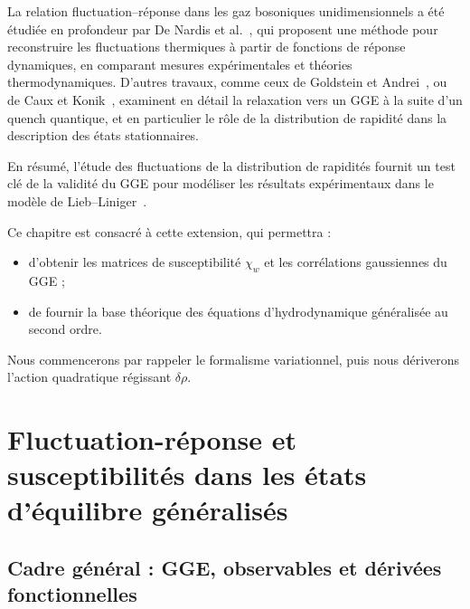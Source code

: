 {La relation fluctuation–réponse dans les gaz bosoniques unidimensionnels a été étudiée en profondeur par De Nardis et al.~\cite{DeNardis2017}, qui proposent une méthode pour reconstruire les fluctuations thermiques à partir de fonctions de réponse dynamiques, en comparant mesures expérimentales et théories thermodynamiques. D'autres travaux, comme ceux de Goldstein et Andrei~\cite{Goldstein2013}, ou de Caux et Konik~\cite{CauxKonik2012}, examinent en détail la relaxation vers un GGE à la suite d’un quench quantique, et en particulier le rôle de la distribution de rapidité dans la description des états stationnaires.

}

\medskip
En résumé, l’étude des fluctuations de la distribution de rapidités fournit un test clé de la validité du GGE pour modéliser les résultats expérimentaux dans le modèle de Lieb–Liniger~\cite{DeNardis2017}.

\medskip
Ce chapitre est consacré à cette extension, qui permettra :
\begin{itemize}[label = $\bullet$]
  \item d’obtenir les matrices de susceptibilité \(\chi_{w}\)  et les corrélations gaussiennes du GGE ;
  \item de fournir la base théorique des équations d’hydrodynamique généralisée au second ordre.
\end{itemize}

Nous commencerons par rappeler le formalisme variationnel, puis nous dériverons l’action quadratique régissant \(\delta\rho\).  %


\section{Fluctuation-réponse et susceptibilités dans les états d’équilibre généralisés}

\subsection{Cadre général : GGE, observables et dérivées fonctionnelles}

